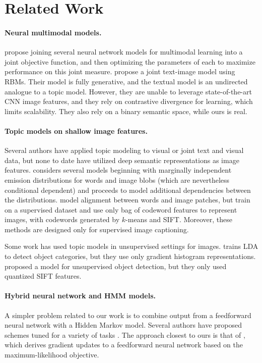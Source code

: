 \documentclass[11pt]{article}
\begin{document}
\section{Related Work}
\paragraph{Neural multimodal models.}
\cite{Lecun98} propose joining several neural network models for multimodal learning into a joint objective function, and then optimizing the parameters of each to maximize performance on this joint measure. \cite{Srivastava14} propose a joint text-image model using RBMs. Their model is fully generative, and the textual model is an undirected analogue to a topic model. However, they are unable to leverage state-of-the-art CNN image features, and they rely on contrastive divergence for learning, which limits scalability. They also rely on a binary semantic space, while ours is real.

\paragraph{Topic models on shallow image features.}
Several authors have applied topic modeling to visual or joint text and visual data, but none to date have utilized deep semantic representations as image features. \cite{Barnard03} considers several models beginning with marginally independent emission distributions for words and image blobs (which are nevertheless conditional dependent) and proceeds to model additional dependencies between the distributions. \cite{Wang09a} model alignment between words and image patches, but train on a supervised dataset and use only bag of codeword features to represent images, with codewords generated by $k$-means and SIFT. Moreover, these methods are designed only for supervised image captioning.

Some work has used topic models in unsupervised settings for images. \cite{Fritz08} trains LDA to detect object categories, but they use only gradient histogram representations. \cite{Cao07} proposed a model for unsupervised object detection, but they only used quantized SIFT features.

\paragraph{Hybrid neural network and HMM models.}
A simpler problem related to our work is to combine output from a feedforward neural network with a Hidden Markov model. Several authors have proposed schemes tuned for a variety of tasks \cite{Trentin01}. The approach closest to ours is that of \cite{Bengio92}, which derives gradient updates to a feedforward neural network based on the maximum-likelihood objective. 
\end{document}
